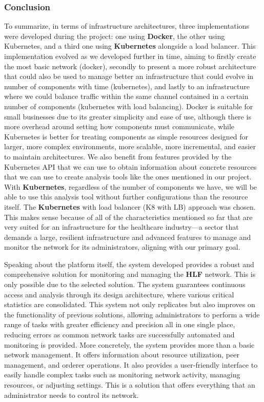 \subsubsection{Conclusion}
To summarize, in terms of infrastructure architectures, three implementations were developed during the project: one using \textbf{Docker}, the other using Kubernetes, and a third one using \textbf{Kubernetes} alongside a load balancer. This implementation evolved as we developed further in time, aiming to firstly create the most basic network (docker), secondly to present a more robust architecture that could also be used to manage better an infrastructure that could evolve in number of components with time (kubernetes), and lastly to an infrastructure where we could balance traffic within the same channel contained in a certain number of components (kubernetes with load balancing). Docker is suitable for small businesses due to its greater simplicity and ease of use, although there is more overhead around setting how components must communicate, while Kubernetes is better for treating components as simple resources designed for larger, more complex environments, more scalable, more incremental, and easier to maintain architectures. We also benefit from features provided by the Kubernetes API that we can use to obtain information about concrete resources that we can use to create analysis tools like the ones mentioned in our project. With \textbf{Kubernetes}, regardless of the number of components we have, we will be able to use this analysis tool without further configurations than the resource itself. The \textbf{Kubernetes} with load balancer (K8 with LB) approach was chosen. This makes sense because of all of the characteristics mentioned so far that are very suited for an infrastructure for the healthcare industry—a sector that demands a large, resilient infrastructure and advanced features to manage and monitor the network for its administrators, aligning with our primary goal.

Speaking about the platform itself, the system developed provides a robust and comprehensive solution for monitoring and managing the \textbf{HLF} network. This is only possible due to the selected solution. The system guarantees continuous access and analysis through its design architecture, where various critical statistics are consolidated. This system not only replicates but also improves on the functionality of previous solutions, allowing administrators to perform a wide range of tasks with greater efficiency and precision all in one single place, reducing errors as common network tasks are successfully automated and monitoring is provided. More concretely, the system provides more than a basic network management. It offers information about resource utilization, peer management, and orderer operations. It also provides a user-friendly interface to easily handle complex tasks such as monitoring network activity, managing resources, or adjusting settings. This is a solution that offers everything that an administrator needs to control its network.

